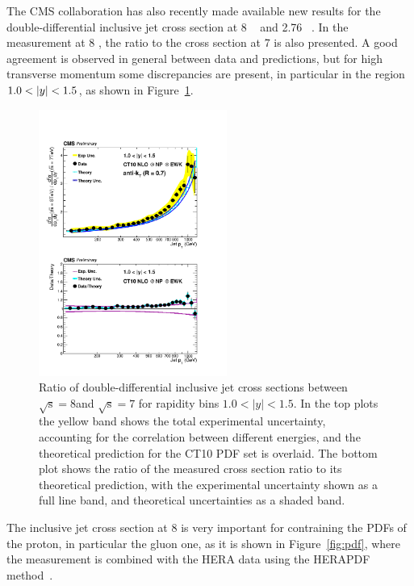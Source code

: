 \documentclass{PoS}
\begin{document}
The CMS collaboration has also recently made available new results for the double-differential inclusive jet cross section at 8
\TeV~\cite{CMS:2015haa} and 2.76 \TeV~\cite{Khachatryan:2015luy}. In the measurement at 8 \TeV, the ratio to the
cross section at 7 \TeV is also presented. A good agreement is observed in general between data and predictions, but for high
transverse momentum some discrepancies are present, in particular in the region $1.0 < \lvert y \rvert < 1.5$, as shown in
Figure~\ref{fig:ratio8to7}.
\begin{figure}[hbpt]
  \centering
  \includegraphics[width=0.55\textwidth]{Figure3.pdf}
  \caption{Ratio of double-differential inclusive jet cross sections
    between $\mathrm{\sqrt{s}=8}$\TeV and $\mathrm{\sqrt{s}=7}$\TeV
    for rapidity bins $1.0 < |y| < 1.5$. In the top plots the yellow band shows the total
    experimental uncertainty, accounting for the correlation between
    different energies, and the theoretical prediction for the CT10
    PDF set is overlaid. The bottom plot shows the ratio of the measured
    cross section ratio to its theoretical prediction, with the
    experimental uncertainty shown as a full line band, and
    theoretical uncertainties as a shaded band.}
  \label{fig:ratio8to7}
\end{figure}
The inclusive jet cross section at 8 \TeV is very important for contraining the PDFs of the proton, in particular the gluon
one, as it is shown in Figure~\ref{fig:pdf}, where the measurement is combined with the HERA
data\cite{Abramowicz:2015mha} using the HERAPDF method~\cite{Aaron:2009aa}. 
\end{document}
